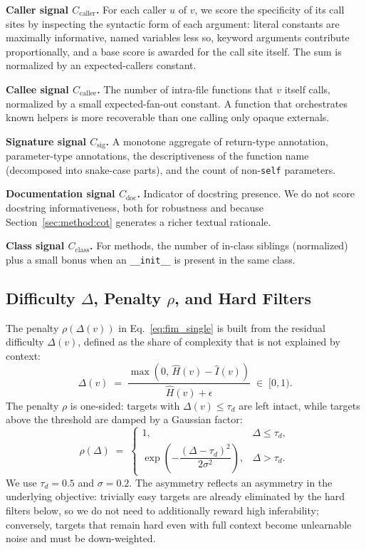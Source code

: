 \textbf{Caller signal $C_{\mathrm{caller}}$.}
For each caller $u$ of $v$, we score the specificity of its call sites
by inspecting the syntactic form of each argument: literal constants are
maximally informative, named variables less so, keyword arguments
contribute proportionally, and a base score is awarded for the call
site itself. The sum is normalized by an expected-callers constant.

\textbf{Callee signal $C_{\mathrm{callee}}$.}
The number of intra-file functions that $v$ itself calls, normalized by
a small expected-fan-out constant. A function that orchestrates known
helpers is more recoverable than one calling only opaque externals.

\textbf{Signature signal $C_{\mathrm{sig}}$.}
A monotone aggregate of return-type annotation, parameter-type
annotations, the descriptiveness of the function name (decomposed into
snake-case parts), and the count of non-\texttt{self} parameters.

\textbf{Documentation signal $C_{\mathrm{doc}}$.}
Indicator of docstring presence. We do not score docstring
informativeness, both for robustness and because
Section~\ref{sec:method:cot} generates a richer textual rationale.

\textbf{Class signal $C_{\mathrm{class}}$.}
For methods, the number of in-class siblings (normalized) plus a small
bonus when an \texttt{\_\_init\_\_} is present in the same class.

\subsection{Difficulty $\Delta$, Penalty $\rho$, and Hard Filters}
\label{app:algo:penalty}

The penalty $\rho(\Delta(v))$ in Eq.~\eqref{eq:fim_single} is built from
the residual difficulty $\Delta(v)$, defined as the share of complexity
that is not explained by context:
\begin{equation}
  \Delta(v) \;=\; \frac{\max\!\left(0,\,\hat{H}(v) - \hat{I}(v)\right)}{\hat{H}(v) + \epsilon}
  \;\in\; [0, 1).
  \label{eq:delta}
\end{equation}
The penalty $\rho$ is one-sided: targets with $\Delta(v) \le \tau_d$ are
left intact, while targets above the threshold are damped by a Gaussian
factor:
\begin{equation}
  \rho(\Delta) \;=\;
  \begin{cases}
    1, & \Delta \le \tau_d, \\[2pt]
    \exp\!\left(-\dfrac{(\Delta - \tau_d)^2}{2\sigma^2}\right), & \Delta > \tau_d.
  \end{cases}
  \label{eq:penalty}
\end{equation}
We use $\tau_d = 0.5$ and $\sigma = 0.2$. The asymmetry reflects an
asymmetry in the underlying objective: trivially easy targets are
already eliminated by the hard filters below, so we do not need to
additionally reward high inferability; conversely, targets that remain
hard even with full context become unlearnable noise and must be
down-weighted.

